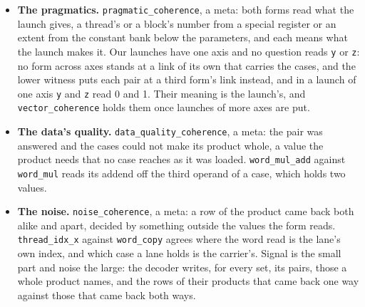 \begin{itemize}
\item \textbf{The pragmatics.} \texttt{pragmatic\_\allowbreak{}coherence}, a meta: both forms read what the launch gives, a thread's or a block's number from a special register or an extent from the constant bank below the parameters, and each means what the launch makes it. Our launches have one axis and no question reads \texttt{y} or \texttt{z}: no form across axes stands at a link of its own that carries the cases, and the lower witness puts each pair at a third form's link instead, and in a launch of one axis \texttt{y} and \texttt{z} read 0 and 1. Their meaning is the launch's, and \texttt{vector\_\allowbreak{}coherence} holds them once launches of more axes are put.
\item \textbf{The data's quality.} \texttt{data\_\allowbreak{}quality\_\allowbreak{}coherence}, a meta: the pair was answered and the cases could not make its product whole, a value the product needs that no case reaches as it was loaded. \texttt{word\_\allowbreak{}mul\_\allowbreak{}add} against \texttt{word\_\allowbreak{}mul} reads its addend off the third operand of a case, which holds two values.
\item \textbf{The noise.} \texttt{noise\_\allowbreak{}coherence}, a meta: a row of the product came back both alike and apart, decided by something outside the values the form reads. \texttt{thread\_\allowbreak{}idx\_\allowbreak{}x} against \texttt{word\_\allowbreak{}copy} agrees where the word read is the lane's own index, and which case a lane holds is the carrier's. Signal is the small part and noise the large: the decoder writes, for every set, its pairs, those a whole product names, and the rows of their products that came back one way against those that came back both ways.

\end{itemize}
